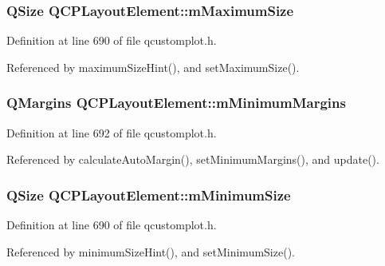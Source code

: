 \subsubsection[{m\+Maximum\+Size}]{\setlength{\rightskip}{0pt plus 5cm}Q\+Size Q\+C\+P\+Layout\+Element\+::m\+Maximum\+Size\hspace{0.3cm}{\ttfamily [protected]}}\label{class_q_c_p_layout_element_a64a387973fd4addac842028c89088998}


Definition at line 690 of file qcustomplot.\+h.



Referenced by maximum\+Size\+Hint(), and set\+Maximum\+Size().

\hypertarget{class_q_c_p_layout_element_a5ba71f25d1af4bb092b28df618538e63}{}
\subsubsection[{m\+Minimum\+Margins}]{\setlength{\rightskip}{0pt plus 5cm}Q\+Margins Q\+C\+P\+Layout\+Element\+::m\+Minimum\+Margins\hspace{0.3cm}{\ttfamily [protected]}}\label{class_q_c_p_layout_element_a5ba71f25d1af4bb092b28df618538e63}


Definition at line 692 of file qcustomplot.\+h.



Referenced by calculate\+Auto\+Margin(), set\+Minimum\+Margins(), and update().

\hypertarget{class_q_c_p_layout_element_affef747c81632de33f08483b7fd10d01}{}
\subsubsection[{m\+Minimum\+Size}]{\setlength{\rightskip}{0pt plus 5cm}Q\+Size Q\+C\+P\+Layout\+Element\+::m\+Minimum\+Size\hspace{0.3cm}{\ttfamily [protected]}}\label{class_q_c_p_layout_element_affef747c81632de33f08483b7fd10d01}


Definition at line 690 of file qcustomplot.\+h.



Referenced by minimum\+Size\+Hint(), and set\+Minimum\+Size().

